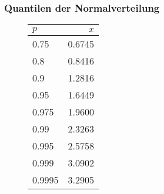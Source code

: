 \subsubsection{Quantilen der Normalverteilung}
\begin{figure}[!h]
  \begin{center}
    \scriptsize
    \begin{tabular}{|l|r|}
      \hline
      $p$&$x$ \\
      \hline
      0.75&0.6745 \\
      0.8&0.8416 \\
      0.9&1.2816 \\
      0.95&1.6449 \\
      0.975&1.9600 \\
      0.99&2.3263 \\
      0.995&2.5758 \\
      0.999&3.0902 \\
      0.9995&3.2905 \\
      \hline
    \end{tabular}
  \end{center}
\end{figure}

\pagebreak
